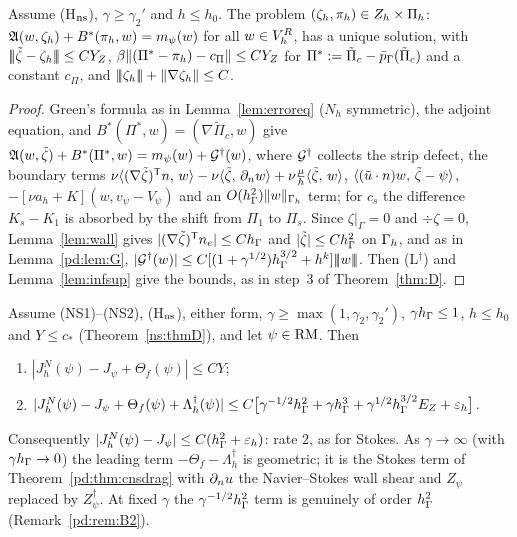 \begin{lemma}\label{n2:aux}
Assume (H$_{\rm ns}$), $\gamma\ge\gamma_2'$ and $h\le h_0$. The problem $(\zeta_h,\pi_h)\in Z_h\times\Pi_h$: $\mathfrak A(w,\zeta_h)+B^\ast(\pi_h,w)=m_\psi(w)$ for all $w\in V_h^R$, has a unique solution, with $|\!|\!|\tilde\zeta-\zeta_h|\!|\!|\le CY_Z$, $\beta\lVert (\Pi^\ast-\pi_h)-c_\Pi\rVert\le CY_Z$ for $\Pi^\ast:=\tilde\Pi_c-\bar p_{\Gamma}(\tilde\Pi_c)$ and a constant $c_\Pi$, and $|\!|\!|\zeta_h|\!|\!|+\lVert \nabla\zeta_h\rVert\le C$.
\end{lemma}

\begin{proof}
Green's formula as in Lemma~\ref{lem:erroreq} ($N_h$ symmetric), the adjoint equation, and $B^\ast(\Pi^\ast,w)=(\nabla\tilde\Pi_c,w)$ give $\mathfrak A(w,\tilde\zeta)+B^\ast(\Pi^\ast,w)=m_\psi(w)+\mathcal G^\dagger(w)$, where $\mathcal G^\dagger$ collects the strip defect, the boundary terms $\nu\langle (\nabla\tilde\zeta)^{\mathsf T}n,\, w\rangle-\nu\langle \tilde\zeta,\, \partial_n w\rangle+\nu\frac\mu h\langle \tilde\zeta,\, w\rangle$, $\langle (\tilde u\cdot n)w,\, \tilde\zeta-\psi\rangle$, $-[\nu a_h+K](w,v_\psi-V_\psi)$ and an $O(h_\Gamma^2)\lVert w\rVert_{\Gamma_h}$ term; for $c_s$ the difference $K_s-K_1$ is absorbed by the shift from $\Pi_1$ to $\Pi_s$. Since $\zeta|_\Gamma=0$ and $\div\zeta=0$, Lemma~\ref{lem:wall} gives $|(\nabla\tilde\zeta)^{\mathsf T}n_e|\le Ch_\Gamma$ and $|\tilde\zeta|\le Ch_\Gamma^2$ on $\Gamma_h$, and as in Lemma~\ref{pd:lem:G}, $|\mathcal G^\dagger(w)|\le C[(1+\gamma^{1/2})h_\Gamma^{3/2}+h^k]|\!|\!|w|\!|\!|$. Then (L$^\dagger$) and Lemma~\ref{lem:infsup} give the bounds, as in step~3 of Theorem~\ref{thm:D}.
\end{proof}

\begin{theorem}\label{n2:cnsdrag}
Assume (NS1)--(NS2), (H$_{\rm ns}$), either form, $\gamma\ge\max(1,\gamma_2,\gamma_2')$, $\gamma h_\Gamma\le1$, $h\le h_0$ and $Y\le c_\ast$ (Theorem~\ref{ns:thmD}), and let $\psi\in\mathrm{RM}$. Then
\begin{enumerate}[label=(\alph*)]
\item $|J^N_h(\psi)-J_\psi+\Theta_f(\psi)|\le CY$;
\item $|J^N_h(\psi)-J_\psi+\Theta_f(\psi)+\Lambda^\dagger_h(\psi)|\le C\bigl[\gamma^{-1/2}h_\Gamma^2+\gamma h_\Gamma^3+\gamma^{1/2}h_\Gamma^{3/2}E_Z+\varepsilon_h\bigr]$.
\end{enumerate}
Consequently $|J^N_h(\psi)-J_\psi|\le C(h_\Gamma^2+\varepsilon_h)$: rate $2$, as for Stokes. As $\gamma\to\infty$ (with $\gamma h_\Gamma\to0$) the leading term $-\Theta_f-\Lambda^\dagger_h$ is geometric; it is the Stokes term of Theorem~\ref{pd:thm:cnsdrag} with $\partial_n u$ the Navier--Stokes wall shear and $Z_\psi$ replaced by $Z^\dagger_\psi$. At fixed $\gamma$ the $\gamma^{-1/2}h_\Gamma^2$ term is genuinely of order $h_\Gamma^2$ (Remark~\ref{pd:rem:B2}).
\end{theorem}


